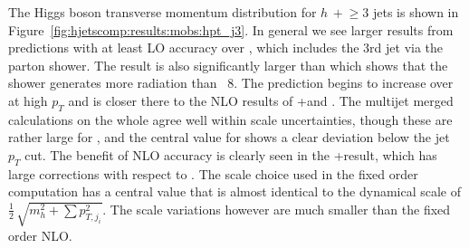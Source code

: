 The Higgs boson transverse momentum distribution for $h\,+\!\ge\!\!3$ jets is shown in
Figure~\ref{fig:hjetscomp:results:mobs:hpt_j3}. In general we see larger
results from predictions with at least LO accuracy over \Powheg, which includes
the 3rd jet via the parton shower. The \Sherpa \NNLOPS result is also
significantly larger than \Powheg which shows that the \Sherpa shower generates
more radiation than \Pythia~8. The \Hej prediction begins to increase over
\Powheg at high $p_T$ and is closer there to the NLO results of \GoSam{}+\Sherpa and
\Sherpa \MEPSatNLO. The multijet merged calculations on the whole agree well
within scale uncertainties, though these are rather large for \MGaMC, and the
central value for \Herwig shows a clear deviation below the jet $p_T$ cut. The
benefit of NLO accuracy is clearly seen in the \GoSam{}+\Sherpa result, which has large
corrections with respect to  \Powheg. The \Minlo scale choice used in the fixed order
computation has a central value that is almost identical to the dynamical scale
of $\tfrac{1}{2}\,\sqrt{m_{h}^2+\sum p_{T,j_i}^2}$. The scale variations
however are much smaller than the fixed order NLO.

